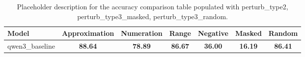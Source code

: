 \begin{table}[ht]
\centering
{}
\small
\begin{tabular}{lcccccc}
\hline
Model & Approximation & Numeration & Range & Negative & Masked & Random \\
\hline
qwen3\_baseline & \textbf{88.64} & \textbf{78.89} & \textbf{86.67} & \textbf{36.00} & \textbf{16.19} & \textbf{86.41} \\
\hline
\end{tabular}
\caption{Placeholder description for the accuracy comparison table populated with perturb\_type2, perturb\_type3\_masked, perturb\_type3\_random.}
\end{table}
